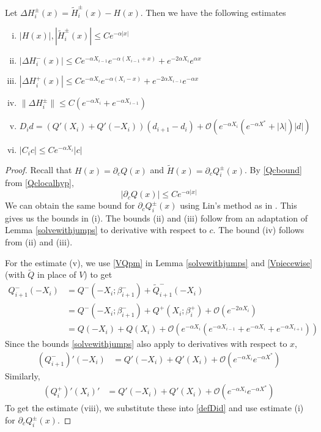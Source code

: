 \documentclass[thesis.tex]{subfiles}
\begin{document}
\begin{lemma}\label{stabestimateslemma}
Let $\Delta H_i^\pm(x) = \tilde{H}_i^\pm(x) - H(x)$. Then we have the following estimates
\begin{enumerate}[(i)]
\item $|H(x)|, |\tilde{H}_i^\pm(x)| \leq C e^{-\alpha |x|}$
\item $|\Delta H_i^-(x)| \leq C e^{-\alpha X_{i-1}} e^{-\alpha(X_{i-1} + x) } + e^{-2 \alpha X_i} e^{\alpha x}$
\item $|\Delta H_i^+(x)| \leq C e^{-\alpha X_i} e^{-\alpha(X_i - x) } + e^{-2 \alpha X_{i-1}} e^{-\alpha x}$
\item $\|\Delta H_i^\pm\| \leq C(e^{-\alpha X_i} + e^{-\alpha X_{i-1}} )$
\item $D_i d = ( Q'(X_i) + Q'(-X_i))(d_{i+1} - d_i ) + \mathcal{O} ( e^{-\alpha X_i} (e^{-\alpha X^*} + |\lambda| )|d|)$
\item $|C_i c| \leq C e^{-\alpha X_i} |c|$
\end{enumerate}
\begin{proof}
Recall that $H(x) = \partial_c Q(x)$ and $\tilde{H}(x) = \partial_c Q_i^\pm(x)$. By \cref{Qcbound} from \cref{Qclocalhyp},
\begin{equation}\label{Qcbound1}
|\partial_c Q(x)| \leq C e^{-\alpha|x|}
\end{equation}
We can obtain the same bound for $\partial_c Q_i^\pm(x)$ using Lin's method as in \cite{SandstedeStrut,Sandstede1993}. This gives us the bounds in (i). The bounds (ii) and (iii) follow from an adaptation of Lemma \ref{solvewithjumps} to derivative with respect to $c$. The bound (iv) follows from (ii) and (iii). 

For the estimate (v), we use \eqref{VQpm} in Lemma \ref{solvewithjumps} and \eqref{Vpiecewise} (with $\tilde{Q}$ in place of $V$) to get
\begin{align*}
Q_{i+1}^-(-X_i) &= Q^-(-X_i; \beta_{i+1}^-) + \tilde{Q}_{i+1}^-(-X_i) \\
&= Q^-(-X_i; \beta_{i+1} ^-) + Q^+(X_i; \beta_i^+) + \mathcal{O}(e^{-2 \alpha X_i}) \\
&= Q(-X_i) + Q(X_i) 
+ \mathcal{O}(e^{-\alpha X_i}(e^{-\alpha X_{i-1}}+e^{-\alpha X_i}+e^{-\alpha X_{i+1}}))
\end{align*}
Since the bounds \ref{solvewithjumps} also apply to derivatives with respect to $x$, 
\begin{align*}
(Q_{i+1}^-)'(-X_i) &= Q'(-X_i) + Q'(X_i) + \mathcal{O}(e^{-\alpha X_i}e^{-\alpha X^*})
\end{align*}
Similarly,
\begin{align*}
(Q_i^+)'(X_i)' &= Q'(-X_i) + Q'(X_i) + \mathcal{O}(e^{-\alpha X_i}e^{-\alpha X^*})
\end{align*}
To get the estimate (viii), we substitute these into \cref{defDid} and use estimate (i) for $\partial_c Q_i^\pm(x)$.


\end{proof}
\end{lemma}
\end{document}
